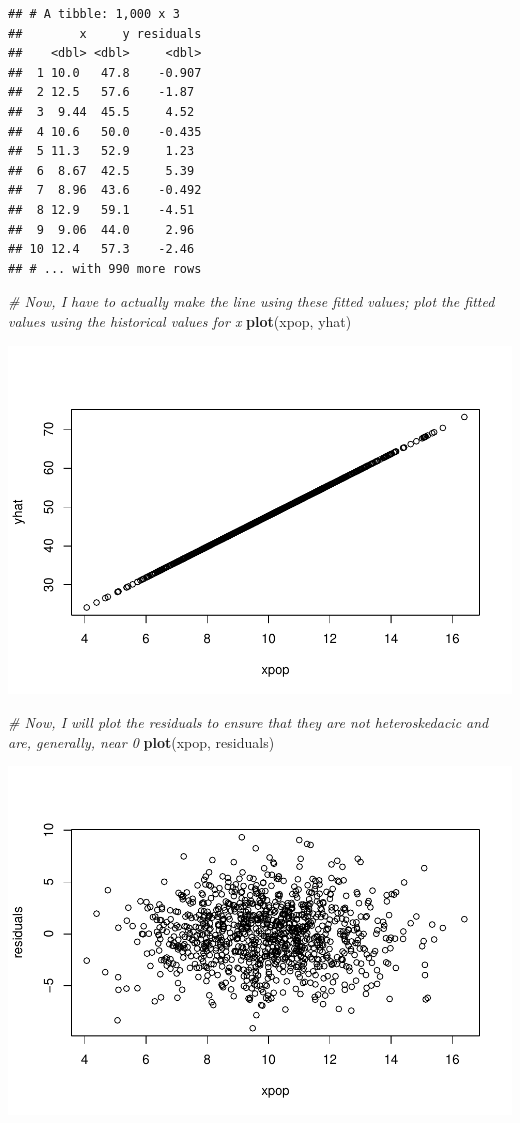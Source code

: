 \documentclass[]{article}
\newenvironment{Shaded}{\begin{snugshade}}{\end{snugshade}}
\newcommand{\KeywordTok}[1]{\textcolor[rgb]{0.13,0.29,0.53}{\textbf{#1}}}
\newcommand{\CommentTok}[1]{\textcolor[rgb]{0.56,0.35,0.01}{\textit{#1}}}
\newcommand{\NormalTok}[1]{#1}
\begin{document}
\begin{verbatim}
## # A tibble: 1,000 x 3
##        x     y residuals
##    <dbl> <dbl>     <dbl>
##  1 10.0   47.8    -0.907
##  2 12.5   57.6    -1.87 
##  3  9.44  45.5     4.52 
##  4 10.6   50.0    -0.435
##  5 11.3   52.9     1.23 
##  6  8.67  42.5     5.39 
##  7  8.96  43.6    -0.492
##  8 12.9   59.1    -4.51 
##  9  9.06  44.0     2.96 
## 10 12.4   57.3    -2.46 
## # ... with 990 more rows
\end{verbatim}

\begin{Shaded}
\begin{Highlighting}[]
\CommentTok{# Now, I have to actually make the line using these fitted values; plot the fitted values using the historical values for x  }
\KeywordTok{plot}\NormalTok{(xpop, yhat)}
\end{Highlighting}
\end{Shaded}

\includegraphics{macroNoGiodP_files/figure-latex/unnamed-chunk-6-1.pdf}

\begin{Shaded}
\begin{Highlighting}[]
\CommentTok{# Now, I will plot the residuals to ensure that they are not heteroskedacic and are, generally, near 0}
\KeywordTok{plot}\NormalTok{(xpop, residuals)}
\end{Highlighting}
\end{Shaded}

\includegraphics{macroNoGiodP_files/figure-latex/unnamed-chunk-6-2.pdf}
\end{document}
